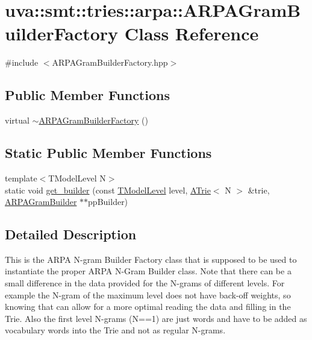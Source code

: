 \hypertarget{classuva_1_1smt_1_1tries_1_1arpa_1_1_a_r_p_a_gram_builder_factory}{}\section{uva\+:\+:smt\+:\+:tries\+:\+:arpa\+:\+:A\+R\+P\+A\+Gram\+Builder\+Factory Class Reference}
\label{classuva_1_1smt_1_1tries_1_1arpa_1_1_a_r_p_a_gram_builder_factory}


{\ttfamily \#include $<$A\+R\+P\+A\+Gram\+Builder\+Factory.\+hpp$>$}

\subsection*{Public Member Functions}
\begin{DoxyCompactItemize}
\item 
virtual \hyperlink{classuva_1_1smt_1_1tries_1_1arpa_1_1_a_r_p_a_gram_builder_factory_a66e551c1d15723bad56b8aa5b91ee87f}{$\sim$\+A\+R\+P\+A\+Gram\+Builder\+Factory} ()
\end{DoxyCompactItemize}
\subsection*{Static Public Member Functions}
\begin{DoxyCompactItemize}
\item 
{\footnotesize template$<$T\+Model\+Level N$>$ }\\static void \hyperlink{classuva_1_1smt_1_1tries_1_1arpa_1_1_a_r_p_a_gram_builder_factory_a9af030073d833c56ebf656c14f35e10b}{get\+\_\+builder} (const \hyperlink{namespaceuva_1_1smt_1_1tries_a20577a44b3a42d26524250634379b7cb}{T\+Model\+Level} level, \hyperlink{classuva_1_1smt_1_1tries_1_1_a_trie}{A\+Trie}$<$ N $>$ \&trie, \hyperlink{classuva_1_1smt_1_1tries_1_1arpa_1_1_a_r_p_a_gram_builder}{A\+R\+P\+A\+Gram\+Builder} $\ast$$\ast$pp\+Builder)
\end{DoxyCompactItemize}


\subsection{Detailed Description}
This is the A\+R\+P\+A N-\/gram Builder Factory class that is supposed to be used to instantiate the proper A\+R\+P\+A N-\/\+Gram Builder class. Note that there can be a small difference in the data provided for the N-\/grams of different levels. For example the N-\/gram of the maximum level does not have back-\/off weights, so knowing that can allow for a more optimal reading the data and filling in the Trie. Also the first level N-\/grams (N==1) are just words and have to be added as vocabulary words into the Trie and not as regular N-\/grams. 

